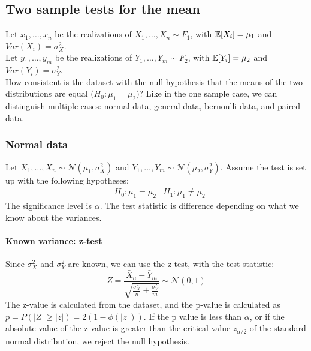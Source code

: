 \subsection{Two sample tests for the mean}
Let $x_1, \ldots, x_n$ be the realizations of $X_1, \ldots, X_n \sim F_1$, with $\mathbb{E}[X_i] = \mu_1$ and $Var(X_i) = \sigma_X^2$. \\
Let $y_1, \ldots, y_m$ be the realizations of $Y_1, \ldots, Y_m \sim F_2$, with $\mathbb{E}[Y_i] = \mu_2$ and $Var(Y_i) = \sigma_Y^2$. \\
How consistent is the dataset with the null hypothesis that the means of the two distributions are equal ($H_0: \mu_1 = \mu_2$)? Like in the one sample case, we can distinguish multiple cases: normal data, general data, bernoulli data, and paired data.

\subsubsection{Normal data}
Let $X_1, \ldots, X_n \sim \mathcal{N}(\mu_1, \sigma_X^2)$ and $Y_1, \ldots, Y_m \sim \mathcal{N}(\mu_2, \sigma_Y^2)$. Assume the test is set up with the following hypotheses:
\begin{align*}
    &H_0 : \mu_1 = \mu_2 &H_1 : \mu_1 \not = \mu_2
\end{align*}
The significance level is $\alpha$. The test statistic is difference depending on what we know about the variances.

\paragraph{Known variance: z-test}
Since $\sigma_X^2$ and $\sigma_Y^2$ are known, we can use the z-test, with the test statistic:
\begin{equation*}
    Z = \frac{\bar{X}_n - \bar{Y}_m}{\sqrt{\frac{\sigma_X^2}{n} + \frac{\sigma_Y^2}{m}}} \sim \mathcal{N}(0,1)
\end{equation*}
The z-value is calculated from the dataset, and the p-value is calculated as $p = P(|Z| \geq |z|) = 2(1-\phi(|z|))$. If the p value is less than $\alpha$, or if the absolute value of the z-value is greater than the critical value $z_{\alpha/2}$ of the standard normal distribution, we reject the null hypothesis.

